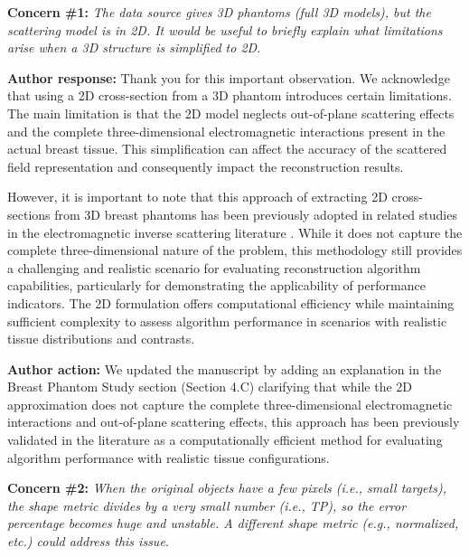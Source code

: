 \documentclass[12pt, a4paper]{article}
\newcommand{\concern}[2]{
    \noindent \textbf{Concern \##1:} \textit{#2}
    \par\vspace{0.3cm}
}
\newcommand{\response}[1]{
    \noindent \textbf{Author response:} #1
    \par\vspace{0.3cm}
}
\newcommand{\action}[1]{
    \noindent \textbf{Author action:} #1
    \par\vspace{0.5cm}
}
\begin{document}
\concern{1}{The data source gives 3D phantoms (full 3D models), but the scattering model is in 2D. It would be useful to briefly explain what limitations arise when a 3D structure is simplified to 2D.}
\response{Thank you for this important observation. We acknowledge that using a 2D cross-section from a 3D phantom introduces certain limitations. The main limitation is that the 2D model neglects out-of-plane scattering effects and the complete three-dimensional electromagnetic interactions present in the actual breast tissue. This simplification can affect the accuracy of the scattered field representation and consequently impact the reconstruction results.

However, it is important to note that this approach of extracting 2D cross-sections from 3D breast phantoms has been previously adopted in related studies in the electromagnetic inverse scattering literature \cite{contzano2023fast,wu2024physics,shah2018fast,batista2025eispy2d}. While it does not capture the complete three-dimensional nature of the problem, this methodology still provides a challenging and realistic scenario for evaluating reconstruction algorithm capabilities, particularly for demonstrating the applicability of performance indicators. The 2D formulation offers computational efficiency while maintaining sufficient complexity to assess algorithm performance in scenarios with realistic tissue distributions and contrasts.}
\action{We updated the manuscript by adding an explanation in the Breast Phantom Study section (Section 4.C) clarifying that while the 2D approximation does not capture the complete three-dimensional electromagnetic interactions and out-of-plane scattering effects, this approach has been previously validated in the literature as a computationally efficient method for evaluating algorithm performance with realistic tissue configurations.}

\concern{2}{When the original objects have a few pixels (i.e., small targets), the shape metric divides by a very small number (i.e., TP), so the error percentage becomes huge and unstable. A different shape metric (e.g., normalized, etc.) could address this issue.}
\end{document}
